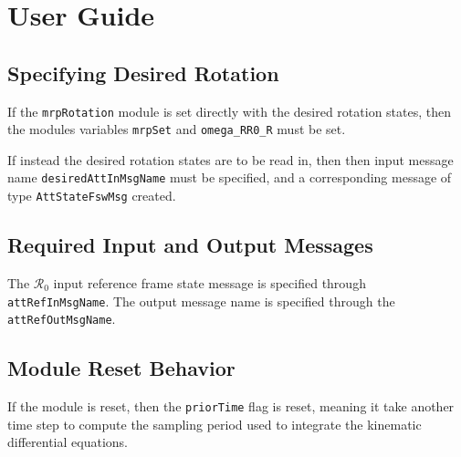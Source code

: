 
\section{User Guide}
\subsection{Specifying Desired Rotation}
If the {\tt mrpRotation} module is set directly with the desired rotation states, then the modules variables {\tt mrpSet} and {\tt omega\_RR0\_R} must be set.

If instead the desired rotation states are to be read in, then then input message name {\tt desiredAttInMsgName} must be specified, and a corresponding message of type {\tt AttStateFswMsg} created.  

\subsection{Required Input and Output Messages}
The $\mathcal{R}_{0}$ input reference frame state message is specified through {\tt attRefInMsgName}.
The output message name is specified through the {\tt attRefOutMsgName}. 

\subsection{Module Reset Behavior}
If the module is reset, then the {\tt priorTime} flag is reset, meaning it take another time step to compute the sampling period used to integrate the kinematic differential equations.  